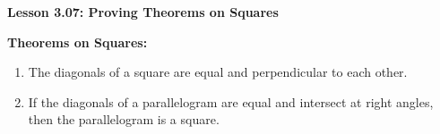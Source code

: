 \begin{center}
\textbf{Lesson 3.07: Proving Theorems on Squares}
\end{center}

\vspace*{-1.5ex}

\noindent\textbf{Theorems on Squares:}
\begin{enumerate}[noitemsep, label = \color{blue}\arabic*. ]
\item The diagonals of a square are equal and perpendicular to each other.
\item If the diagonals of a parallelogram are equal and intersect at right angles, then the parallelogram is a square.
\end{enumerate}

